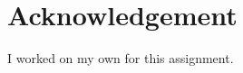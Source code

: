 \documentclass[10pt, a4paper]{article}
\begin{document}
\section{Acknowledgement}
I worked on my own for this assignment.


\makereferences


\end{document}
